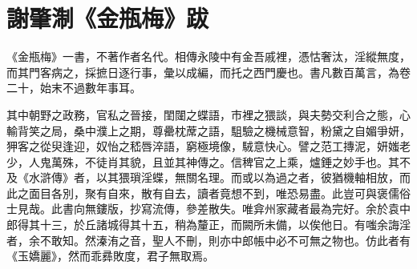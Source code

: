 \chapter*{謝肇淛《金瓶梅》跋}

《金瓶梅》一書，不著作者名代。相傳永陵中有金吾戚裡，憑怙奢汰，淫縱無度，而其門客病之，採摭日逐行事，彙以成編，而托之西門慶也。書凡數百萬言，為卷二十，始末不過數年事耳。

其中朝野之政務，官私之晉接，閨闥之蝶語，市裡之猥談，與夫勢交利合之態，心輸背笑之局，桑中濮上之期，尊罍枕蓆之語，駔驗之機械意智，粉黛之自媚爭妍，狎客之從臾逢迎，奴怡之嵇唇淬語，窮極境像，駥意快心。譬之范工摶泥，妍媸老少，人鬼萬殊，不徒肖其貌，且並其神傳之。信稗官之上乘，爐錘之妙手也。其不及《水滸傳》者，以其猥瑣淫蝶，無關名理。而或以為過之者，彼猶機軸相放，而此之面目各別，聚有自來，散有自去，讀者竟想不到，唯恐易盡。此豈可與褒儒俗士見哉。此書向無鏤版，抄寫流傳，參差散失。唯弇州家藏者最為完好。余於袁中郎得其十三，於丘諸城得其十五，稍為釐正，而闕所未備，以俟他日。有嗤余誨淫者，余不敢知。然溱洧之音，聖人不刪，則亦中郎帳中必不可無之物也。仿此者有《玉嬌麗》，然而乖彞敗度，君子無取焉。
  
\begin{quotation}
\end{quotation}

